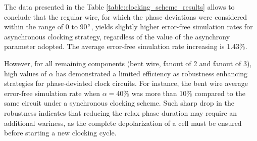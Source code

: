 The data presented in the Table \ref{table:clocking_scheme_results} allows to conclude that the regular wire, for which the phase deviations were considered within the range of 0 to 90$\degree$, yields slightly higher error-free simulation rates for asynchronous clocking strategy, regardless of the value of the asynchrony parameter adopted. The average error-free simulation rate increasing is 1.43\%.

However, for all remaining components (bent wire, fanout of 2 and fanout of 3), high values of $\alpha$ has demonstrated a limited efficiency as robustness enhancing strategies for phase-deviated clock circuits. For instance, the bent wire average error-free simulation rate when $\alpha=$40\% was more than 10\% compared to the same circuit under a synchronous clocking scheme. Such sharp drop in the robustness indicates that reducing the relax phase duration may require an additional wariness, as the complete depolarization of a cell must be ensured before starting a new clocking cycle.



